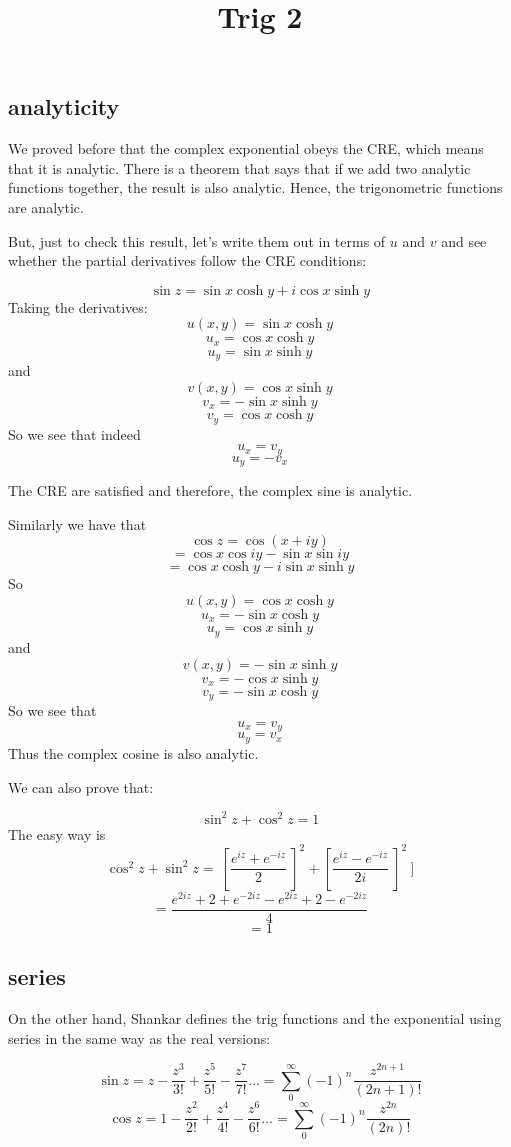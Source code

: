 \documentclass[11pt, oneside]{article}
\title{Trig 2}
\date{}
\begin{document}
\maketitle
\Large


\subsection*{analyticity}
We proved before that the complex exponential obeys the CRE, which means that it is analytic.  There is a theorem that says that if we add two analytic functions together, the result is also analytic.  Hence, the trigonometric functions are analytic.

But, just to check this result, let's write them out in terms of $u$ and $v$ and see whether the partial derivatives follow the CRE conditions:

\[ \sin z = \sin x \cosh y + i \cos x \sinh y \]
Taking the derivatives:
\[ u(x,y) =  \sin x \cosh y \]
\[ u_x = \cos x \cosh y \]
\[ u_y = \sin x \sinh y \]
and
\[ v(x,y) = \cos x \sinh y \]
\[ v_x = - \sin x \sinh y \]
\[ v_y = \cos x \cosh y \]
So we see that indeed
\[ u_x = v_y \]
\[ u_y = -v_x \]

The CRE are satisfied and therefore, the complex sine is analytic.

Similarly we have that 
\[ \cos z = \cos (x + iy) \]
\[ = \cos x \cos iy - \sin x \sin iy \]
\[ = \cos x \cosh y - i \sin x \sinh y \]
So
\[ u(x,y) =  \cos x \cosh y \]
\[ u_x = - \sin x \cosh y \]
\[ u_y = \cos x \sinh y \]
and
\[ v(x,y) = -\sin x \sinh y \]
\[ v_x = -\cos x \sinh y \]
\[ v_y = -\sin x \cosh y \]
So we see that
\[ u_x = v_y \]
\[ u_y = v_x \]
Thus the complex cosine is also analytic.

We can also prove that:

\[ \sin^2 z + \cos^2 z = 1 \]
The easy way is
\[ \cos^2 z + \sin^2 z = \ [ \frac{e^{iz} + e^{-iz}}{2} \ ]^2 +  [ \frac{e^{iz} - e^{-iz}}{2i} \ ]^2 \ ] \]
\[= \frac{e^{2iz} + 2 + e^{-2iz} - e^{2iz} + 2 - e^{-2iz} }{4} \]
\[ = 1 \]

\subsection*{series}
On the other hand, Shankar defines the trig functions and the exponential using series in the same way as the real versions:

\[ \sin z = z - \frac{z^3}{3!} + \frac{z^5}{5!} - \frac{z^7}{7!} \dots = \sum_0^{\infty} (-1)^n \frac{z^{2n+1}}{(2n +1)!} \]
\[ \cos z = 1 - \frac{z^2}{2!} + \frac{z^4}{4!} - \frac{z^6}{6!} \dots = \sum_0^{\infty} (-1)^n \frac{z^{2n}}{(2n)!} \]
\end{document}
